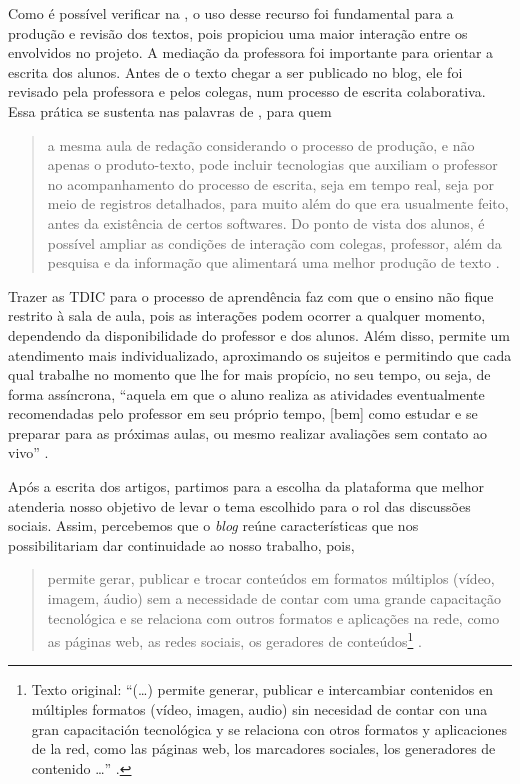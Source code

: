 \documentclass{textolivre}
\begin{document}
Como é possível verificar na , o uso desse recurso foi fundamental para a produção e revisão dos textos, pois propiciou uma maior interação entre os envolvidos no projeto. A mediação da professora foi importante para orientar a escrita dos alunos. Antes de o texto chegar a ser publicado no blog, ele foi revisado pela professora e pelos colegas, num processo de escrita colaborativa. Essa prática se sustenta nas palavras de \textcite{ribeiro2018}, para quem
\begin{quote}
a mesma aula de redação considerando o processo de produção, e não apenas o produto-texto, pode incluir tecnologias que auxiliam o professor no acompanhamento do processo de escrita, seja em tempo real, seja por meio de registros detalhados, para muito além do que era usualmente feito, antes da existência de certos softwares. Do ponto de vista dos alunos, é possível ampliar as condições de interação com colegas, professor, além da pesquisa e da informação que alimentará uma melhor produção de texto \cite[p.~110]{ribeiro2018}.
\end{quote}

Trazer as TDIC para o processo de aprendência faz com que o ensino não fique restrito à sala de aula, pois as interações podem ocorrer a qualquer momento, dependendo da disponibilidade do professor e dos alunos. Além disso, permite um atendimento mais individualizado, aproximando os sujeitos e permitindo que cada qual trabalhe no momento que lhe for mais propício, no seu tempo, ou seja, de forma assíncrona, “aquela em que o aluno realiza as atividades eventualmente recomendadas pelo professor em seu próprio tempo, [bem] como estudar e se preparar para as próximas aulas, ou mesmo realizar avaliações sem contato ao vivo” \cite[p.~12]{almeida2010}.

Após a escrita dos artigos, partimos para a escolha da plataforma que melhor atenderia nosso objetivo de levar o tema escolhido para o rol das discussões sociais. Assim, percebemos que o \emph{blog} reúne características que nos possibilitariam dar continuidade ao nosso trabalho, pois,
\begin{quote}
permite gerar, publicar e trocar conteúdos em formatos múltiplos (vídeo, imagem, áudio) sem a necessidade de contar com uma grande capacitação tecnológica e se relaciona com outros formatos e aplicações na rede, como as páginas web, as redes sociais, os geradores de conteúdos\footnote{Texto original: “(\ldots) permite generar, publicar e intercambiar contenidos en múltiples formatos (vídeo, imagen, audio) sin necesidad de contar con una gran capacitación tecnológica y se relaciona con otros formatos y aplicaciones de la red, como las páginas web, los marcadores sociales, los generadores de contenido \ldots” \cite[p.~8]{fernandez2012}.} \cite[p.~8 - tradução livre nossa]{fernandez2012}.
\end{quote}
\end{document}
